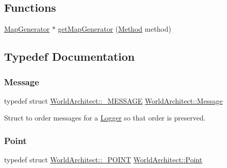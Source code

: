 \subsection*{Functions}
\begin{DoxyCompactItemize}
\item 
\mbox{\hyperlink{class_world_architect_1_1_map_generator}{Map\+Generator}} $\ast$ \mbox{\hyperlink{namespace_world_architect_a984fb538abd7ab5b38bbce0a7bfae707}{get\+Map\+Generator}} (\mbox{\hyperlink{namespace_world_architect_a9bb4333e2d555bf42bf7d14ec2a2ae7b}{Method}} method)
\end{DoxyCompactItemize}


\subsection{Typedef Documentation}
\mbox{\label{namespace_world_architect_a43ffc83197b30a5636e3dc65fba782a1}} 
\subsubsection{\texorpdfstring{Message}{Message}}
{\footnotesize\ttfamily typedef struct \mbox{\hyperlink{struct_world_architect_1_1___m_e_s_s_a_g_e}{World\+Architect\+::\+\_\+\+M\+E\+S\+S\+A\+GE}}  \mbox{\hyperlink{namespace_world_architect_a43ffc83197b30a5636e3dc65fba782a1}{World\+Architect\+::\+Message}}}



Struct to order messages for a \mbox{\hyperlink{class_world_architect_1_1_logger}{Logger}} so that order is preserved. 

\mbox{\label{namespace_world_architect_afe984ab247ed2917d3a738c7d83d33ca}} 
\subsubsection{\texorpdfstring{Point}{Point}}
{\footnotesize\ttfamily typedef struct \mbox{\hyperlink{struct_world_architect_1_1___p_o_i_n_t}{World\+Architect\+::\+\_\+\+P\+O\+I\+NT}} \mbox{\hyperlink{namespace_world_architect_afe984ab247ed2917d3a738c7d83d33ca}{World\+Architect\+::\+Point}}}




